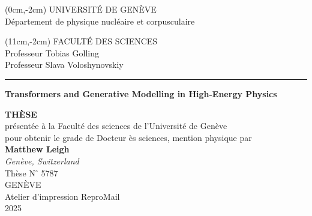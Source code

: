 \begin{titlepage}
    \thispagestyle{empty}

    \begin{textblock*}{10cm}(0cm,-2cm)
        UNIVERSIT\'E DE GEN\`EVE \\  D\'epartement de physique nucl\'eaire et corpusculaire\\[-0.1em]
    \end{textblock*}
    \begin{textblock*}{5cm}(11cm,-2cm)
        FACULT\'E DES SCIENCES \\
        Professeur Tobias Golling\\
        Professeur Slava Voloshynovskiy\\[-0.1em]
    \end{textblock*}
    \rule{16cm}{1pt}

    \begin{center}

        \vskip1.0in
        \Large{
            \begin{boldmath}
                {\textbf{Transformers and Generative Modelling
                        in High-Energy Physics}} \\
            \end{boldmath}

        }
        \vskip0.57in
        \Large{
            {\bf TH\`ESE} \\
        }
        \large{
            \vskip0.44in
            pr\'esent\'ee \`a la Facult\'e des sciences de
            l'Universit\'e de Gen\`eve \\
            pour obtenir le grade de Docteur \`es sciences, mention
            physique
            \vskip0.44in
        }
        par \\
        \vskip0.44in
        \Large{
            {\textbf{Matthew Leigh}} \\
        }
        \vskip0.2in
        \Large{
            {\emph{Genève, Switzerland} \\
                }}
        \vskip1.2in
        Th\`ese N$^\circ$ 5787\\
        \vskip1.6in
        \large{
            GEN\`EVE \\ Atelier d'impression ReproMail \\ 2025\\}
        \vskip0.6in

    \end{center}
\end{titlepage}
